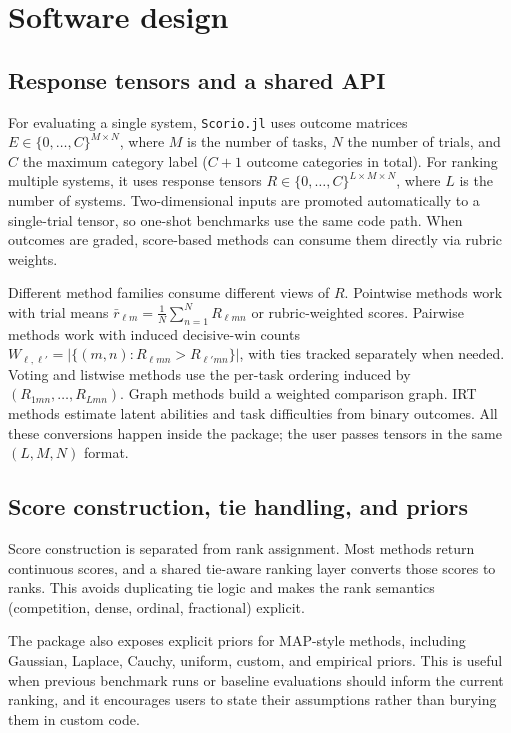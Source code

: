 \documentclass{juliacon}
\newcommand{\scorio}{\texttt{Scorio.jl}}
\begin{document}
\section{Software design}

\subsection{Response tensors and a shared API}

For evaluating a single system, \scorio{} uses outcome matrices \(E \in \{0,\ldots,C\}^{M\times N}\), where \(M\) is the number of tasks, \(N\) the number of trials, and \(C\) the maximum category label (\(C+1\) outcome categories in total). For ranking multiple systems, it uses response tensors \(R \in \{0,\ldots,C\}^{L\times M\times N}\), where \(L\) is the number of systems. Two-dimensional inputs are promoted automatically to a single-trial tensor, so one-shot benchmarks use the same code path. When outcomes are graded, score-based methods can consume them directly via rubric weights.

Different method families consume different views of \(R\). Pointwise methods work with trial means \(\bar r_{\ell m} = \frac{1}{N}\sum_{n=1}^{N} R_{\ell mn}\) or rubric-weighted scores. Pairwise methods work with induced decisive-win counts \(W_{\ell,\ell'} = \lvert\{(m,n) : R_{\ell mn} > R_{\ell' mn}\}\rvert\), with ties tracked separately when needed. Voting and listwise methods use the per-task ordering induced by \((R_{1mn},\ldots,R_{Lmn})\). Graph methods build a weighted comparison graph. IRT methods estimate latent abilities and task difficulties from binary outcomes. All these conversions happen inside the package; the user passes tensors in the same \((L,M,N)\) format.

\subsection{Score construction, tie handling, and priors}

Score construction is separated from rank assignment. Most methods return continuous scores, and a shared tie-aware ranking layer converts those scores to ranks. This avoids duplicating tie logic and makes the rank semantics (competition, dense, ordinal, fractional) explicit.

The package also exposes explicit priors for MAP-style methods,
including Gaussian, Laplace, Cauchy, uniform, custom, and empirical priors. This is useful when previous benchmark runs or baseline
evaluations should inform the current ranking, and it encourages
users to state their assumptions rather than burying them in custom
code.
\end{document}
